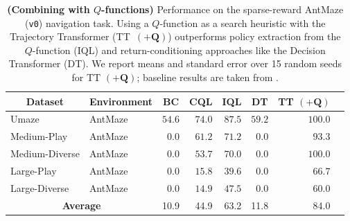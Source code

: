 \begin{table}[t]
\centering
\small
\begin{tabular*}{\textwidth}{@{\extracolsep{\fill}}llrrrrrr}
\toprule
\multicolumn{1}{c}{\bf Dataset} & \multicolumn{1}{c}{\bf Environment} &
    \multicolumn{1}{c}{\bf BC} &
    \multicolumn{1}{c}{\bf CQL} &
    \multicolumn{1}{c}{\bf IQL} &
    \multicolumn{1}{c}{\bf DT} &
    \multicolumn{1}{c}{\bf TT \scriptsize{\textcolor{cgrey}{$\bm{(+Q)}$}}} \\ 
\midrule
Umaze & AntMaze & 
    $54.6$ &
    $74.0$ &
    $87.5$  &
    $59.2$ &
    $100.0$ \scriptsize{\raisebox{1pt}{$\pm 0.0$}} \\ 
Medium-Play & AntMaze &
    $0.0$ &
    $61.2$ &
    $71.2$ &
    $0.0$ &
    $93.3$ \scriptsize{\raisebox{1pt}{$\pm 6.4$}} \\ 
Medium-Diverse & AntMaze &
    $0.0$ &
    $53.7$ &
    $70.0$ &
    $0.0$ &
    $100.0$ \scriptsize{\raisebox{1pt}{$\pm 0.0$}} \\
Large-Play & AntMaze &
    $0.0$ &
    $15.8$ &
    $39.6$ &
    $0.0$ &
    $66.7$ \scriptsize{\raisebox{1pt}{$\pm 12.2$}} \\ 
Large-Diverse & AntMaze &
    $0.0$ &
    $14.9$ &
    $47.5$ &
    $0.0$ &
    $60.0$ \scriptsize{\raisebox{1pt}{$\pm 12.7$}} \\
\midrule
\multicolumn{2}{c}{\bf Average} & 10.9 & 44.9 & 63.2 & 11.8 & 84.0 \hspace{.6cm} \\ 
\bottomrule
\end{tabular*}
\caption{
\textbf{(Combining with $Q$-functions)}
Performance on the sparse-reward AntMaze (\texttt{v0}) navigation task.
Using a $Q$-function as a search heuristic with the Trajectory Transformer ({TT~\scriptsize{\textcolor{cgrey}{$\bm{(+Q)}$}}}) outperforms policy extraction from the $Q$-function (IQL) and return-conditioning approaches like the Decision Transformer (DT).
We report means and standard error over 15 random seeds for {TT \scriptsize{\textcolor{cgrey}{$\bm{(+Q)}$}}}; baseline results are taken from \cite{kostrikov2021implicit}.
}
\vspace{-.1cm}
\label{table:antmaze}
\end{table}
